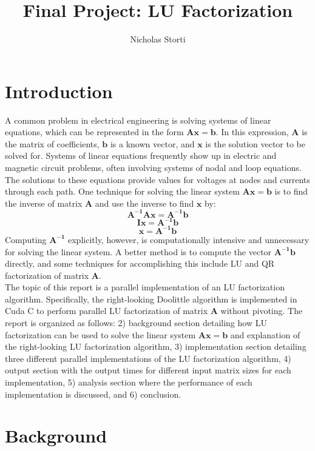\documentclass{article}
\title{Final Project: LU Factorization}
\author{Nicholas Storti}
\begin{document}
\maketitle

\section{Introduction}
A common problem in electrical engineering is solving systems of linear equations, which can be represented in the form $\mathbf{Ax=b}$. In this expression, $\mathbf{A}$ is the matrix of coefficients, $\mathbf{b}$ is a known vector, and $\mathbf{x}$ is the solution vector to be solved for. Systems of linear equations frequently show up in electric and magnetic circuit problems, often involving systems of nodal and loop equations. The solutions to these equations provide values for voltages at nodes and currents through each path. One technique for solving the linear system $\mathbf{Ax=b}$ is to find the inverse of matrix $\mathbf{A}$ and use the inverse to find $\mathbf{x}$ by:
$$\mathbf{A^{-1}Ax=A^{-1}b}$$
$$\mathbf{Ix=A^{-1}b}$$
$$\mathbf{x=A^{-1}b}$$
Computing $\mathbf{A^{-1}}$ explicitly, however, is computationally intensive and unnecessary for solving the linear system. A better method is to compute the vector $\mathbf{A^{-1}b}$ directly, and some techniques for accomplishing this include LU and QR factorization of matrix $\mathbf{A}$.\\

The topic of this report is a parallel implementation of an LU factorization algorithm. Specifically, the right-looking Doolittle algorithm is implemented in Cuda C to perform parallel LU factorization of matrix $\mathbf{A}$ without pivoting. The report is organized as follows: 2) background section detailing how LU factorization can be used to solve the linear system $\mathbf{Ax=b}$ and explanation of the right-looking LU factorization algorithm, 3) implementation section detailing three different parallel implementations of the LU factorization algorithm, 4) output section with the output times for different input matrix sizes for each implementation, 5) analysis section where the performance of each implementation is discussed, and 6) conclusion.

\section{Background}
\end{document}
